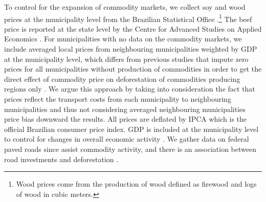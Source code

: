 To control for the expansion of commodity markets, we collect soy and wood prices at the municipality level from the Brazilian Statistical Office \citep{IBGE1}.\footnote{Wood prices come from the production of wood defined as firewood and logs of wood in cubic meters.} The beef price is reported at the state level by the Centre for Advanced Studies on Applied Economics \citep{CEPEA}. For municipalities with no data on the commodity markets, we include averaged local prices from neighbouring municipalities weighted by GDP at the municipality level, which differs from previous studies that impute zero prices for all municipalities without production of commodities in order to get the direct effect of commodity price on deforestation of commodities producing regions only \citep{hargrave_kis-katos_2012, LAKES}. We argue this approach by taking into consideration the fact that prices reflect the transport costs from each municipality to neighbouring municipalities and thus not considering averaged neighbouring municipalities price bias downward the results.
All prices are deflated by IPCA which is the official Brazilian consumer price index. GDP is included at the municipality level to control for changes in overall economic activity \citep{IBGE1}. We gather data on federal paved roads since assist commodity activity, and there is an association between road investments and deforestation \citep{PFAFF3, CROPPER1, BAYNARD, pailler_2018}.


